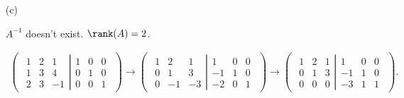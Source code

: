 \begin{Exercise}
\begin{enumerate}[(a)]
		\item[(c)]
		\begin{answer}
			$A^{-1}$ doesn't exist. $\rank(A) = 2$.
		\end{answer}
		\begin{solution}
			\begin{gather*}
			\begin{pmatrix} \left.\begin{matrix}
			1 & 2 & 1 \\
			1 & 3 & 4 \\
			2 & 3 & -1
			\end{matrix} \right| \begin{matrix}
			1 & 0 & 0 \\
			0 & 1 & 0 \\
			0 & 0 & 1
			\end{matrix} \end{pmatrix} \longrightarrow \begin{pmatrix} \left.\begin{matrix}
			1 & 2 & 1 \\
			0 & 1 & 3 \\
			0 & -1 & -3
			\end{matrix} \right| \begin{matrix}
			1 & 0 & 0 \\
			-1 & 1 & 0 \\
			-2 & 0 & 1
			\end{matrix} \end{pmatrix} \longrightarrow \begin{pmatrix} \left.\begin{matrix}
			1 & 2 & 1 \\
			0 & 1 & 3 \\
			0 & 0 & 0 
			\end{matrix} \right| \begin{matrix}
			1 & 0 & 0 \\
			-1 & 1 & 0 \\
			-3 & 1 & 1
			\end{matrix} \end{pmatrix}.
			\end{gather*}
		\end{solution}
	\end{enumerate}
\end{Exercise}